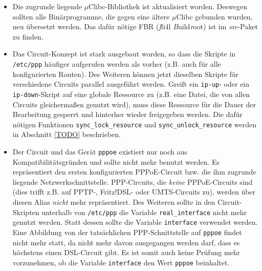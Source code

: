 \begin{itemize}
\item Die zugrunde liegende $\mu$Clibc-Bibliothek ist aktualisiert worden. Deswegen
sollten alle Binärprogramme, die gegen eine ältere $\mu$Clibc gebunden wurden, neu
übersetzt werden. Das dafür nötige FBR (\emph{f}li4l \emph{B}uild\emph{r}oot)
ist im \emph{src}-Paket zu finden.

\item Das Circuit-Konzept ist stark ausgebaut worden, so dass die Skripte in
\texttt{/etc/ppp} häufiger aufgerufen werden als vorher (z.B. auch für alle
konfigurierten Routen). Des Weiteren können jetzt dieselben Skripte für
verschiedene Circuits parallel ausgeführt werden. Greift ein \texttt{ip-up}-
oder ein \texttt{ip-down}-Skript auf eine globale Ressource zu (z.B. eine Datei,
die von allen Circuits gleichermaßen genutzt wird), muss diese Ressource für die
Dauer der Bearbeitung gesperrt und hinterher wieder freigegeben werden. Die
dafür nötigen Funktionen \texttt{sync\_lock\_resource} und
\texttt{sync\_unlock\_resource} werden in Abschnitt \ref{TODO} beschrieben.

\item Der Circuit und das Gerät \texttt{pppoe} existiert nur noch aus
Kompatibilitätsgründen und sollte nicht mehr benutzt werden. Es repräsentiert
den ersten konfigurierten PPPoE-Circuit bzw. die ihm zugrunde liegende
Netzwerkschnittstelle. PPP-Circuits, die \emph{keine} PPPoE-Circuits sind (dies
trifft z.B. auf PPTP-, Fritz!DSL- oder UMTS-Circuits zu), werden über diesen
Alias \emph{nicht} mehr repräsentiert. Des Weiteren sollte in den
Circuit-Skripten unterhalb von \texttt{/etc/ppp} die Variable
\texttt{real\_interface} nicht mehr genutzt werden. Statt dessen sollte
die Variable \texttt{interface} verwendet werden. Eine Abbildung von der
tatsächlichen PPP-Schnittstelle auf \texttt{pppoe} findet nicht mehr statt, da
nicht mehr davon ausgegangen werden darf, dass es höchstens einen DSL-Circuit
gibt. Es ist somit auch keine Prüfung mehr vorzunehmen, ob die Variable
\texttt{interface} den Wert \texttt{pppoe} beinhaltet.
\end{itemize}

